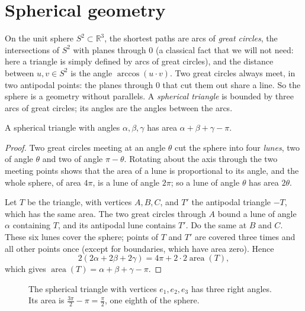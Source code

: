 \section{Spherical geometry}

On the unit sphere $S^2\subset\mathbb R^3$, the shortest paths are arcs of \emph{great circles}, the intersections of $S^2$ with planes through $0$ (a classical fact that we will
not need: here a triangle is simply defined by arcs of great circles), and the distance between $u,v\in S^2$ is the angle
$\arccos(u\cdot v)$. Two great circles always meet, in two antipodal points: the planes through $0$ that cut them out share a line. So the sphere is a
geometry without parallels. A \emph{spherical triangle} is bounded by three arcs of great circles; its angles are the angles between the arcs.

\begin{theorem}[Girard, 1629]\label{geometry:thm:girard}
A spherical triangle with angles $\alpha,\beta,\gamma$ has area $\alpha+\beta+\gamma-\pi$.
\end{theorem}

\begin{proof}
Two great circles meeting at an angle $\theta$ cut the sphere into four \emph{lunes}, two of angle $\theta$ and two of angle $\pi-\theta$. Rotating about the
axis through the two meeting points shows that the area of a lune is proportional to its angle, and the whole sphere, of area $4\pi$, is a lune of angle
$2\pi$; so a lune of angle $\theta$ has area $2\theta$.

Let $T$ be the triangle, with vertices $A,B,C$, and $T'$ the antipodal triangle $-T$, which has the same area. The two great circles through $A$ bound a lune of
angle $\alpha$ containing $T$, and its antipodal lune contains $T'$. Do the same at $B$ and $C$. These six lunes cover the sphere; points of $T$ and $T'$ are
covered three times and all other points once (except for boundaries, which have area zero). Hence
\[
2(2\alpha+2\beta+2\gamma)=4\pi+2\cdot2\operatorname{area}(T),
\]
which gives $\operatorname{area}(T)=\alpha+\beta+\gamma-\pi$.
\end{proof}

\begin{figure}[ht]
\centering
{}
\caption{The spherical triangle with vertices $e_1,e_2,e_3$ has three right angles. Its area is $\frac{3\pi}2-\pi=\frac\pi2$, one eighth of the sphere.}
\label{geometry:fig:sphere}
\end{figure}

